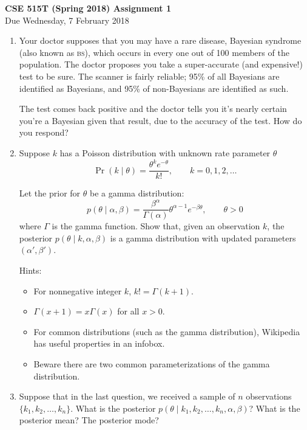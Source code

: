 \documentclass{article}
\newcommand{\acro}[1]{\textsc{\MakeLowercase{#1}}}
\newcommand{\given}{\mid}
\begin{document}
{\large \textbf{CSE 515T (Spring 2018) Assignment 1}} \\
Due Wednesday, 7 February 2018 \\

\begin{enumerate}

\item
  Your doctor supposes that you may have a rare disease, Bayesian
  syndrome (also known as \acro{BS}), which occurs in every one out of
  100 members of the population. The doctor proposes you take a
  super-accurate (and expensive!) test to be sure.  The scanner is
  fairly reliable; 95\% of all Bayesians are identified as Bayesians,
  and 95\% of non-Bayesians are identified as such.

  The test comes back positive and the doctor tells you it's nearly
  certain you're a Bayesian given that result, due to the accuracy of
  the test. How do you respond?

\item
  Suppose $k$ has a Poisson distribution with unknown rate parameter
  $\theta$
  \[
    \Pr(k \given \theta) = \frac{\theta^k e^{-\theta}}{k!},
    \qquad
    k = 0, 1, 2, \dotsc
  \]

  Let the prior for $\theta$ be a gamma distribution:
  \[
    p(\theta \given \alpha, \beta)
    =
    \frac{\beta^\alpha}
         {\Gamma(\alpha)}
    \theta^{\alpha - 1}e^{-\beta\theta},
    \qquad \theta > 0
  \]
  where $\Gamma$ is the gamma function.  Show that, given an
  observation $k$, the posterior $p(\theta \given k, \alpha, \beta)$
  is a gamma distribution with updated parameters $(\alpha', \beta')$.

  Hints:
  \begin{itemize}
  \item For nonnegative integer $k$, $k! = \Gamma(k + 1)$.
  \item $\Gamma(x + 1) = x\Gamma(x)$ for all $x > 0$.
  \item For common distributions (such as the gamma distribution),
    Wikipedia has useful properties in an infobox.
  \item Beware there are two common parameterizations of the gamma distribution.
  \end{itemize}

\item
  Suppose that in the last question, we received a sample of $n$
  observations $\{k_1, k_2, \dotsc, k_n\}$. What is the posterior
  $p(\theta \given k_1, k_2, \dotsc, k_n, \alpha, \beta)$? What is the
  posterior mean? The posterior mode?


\end{enumerate}
\end{document}
